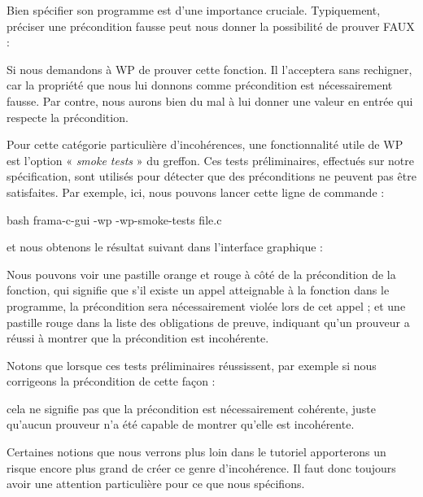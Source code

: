 

Bien spécifier son programme est d'une importance cruciale. Typiquement,
préciser une précondition fausse peut nous donner la possibilité de prouver
FAUX :




Si nous demandons à WP de prouver cette fonction. Il l'acceptera sans rechigner,
car la propriété que nous lui donnons comme précondition est nécessairement fausse.
Par contre, nous aurons bien du mal à lui donner une valeur en entrée qui respecte
la précondition.


Pour cette catégorie particulière d'incohérences, une fonctionnalité utile de WP
est l'option « \textit{smoke tests} » du greffon. Ces tests préliminaires, effectués
sur notre spécification, sont utilisés pour détecter que des préconditions ne peuvent
pas être satisfaites. Par exemple, ici, nous pouvons lancer cette ligne de
commande :


\begin{CodeBlock}{bash}
  frama-c-gui -wp -wp-smoke-tests file.c
\end{CodeBlock}


et nous obtenons le résultat suivant dans l'interface graphique :




Nous pouvons voir une pastille orange et rouge à côté de la précondition de la
fonction, qui signifie que s'il existe un appel atteignable à la fonction dans
le programme, la précondition sera nécessairement violée lors de cet appel ; et
une pastille rouge dans la liste des obligations de preuve, indiquant qu'un
prouveur a réussi à montrer que la précondition est incohérente.


Notons que lorsque ces tests préliminaires réussissent, par exemple si
nous corrigeons la précondition de cette façon :




cela ne signifie pas que la précondition est nécessairement cohérente, juste
qu'aucun prouveur n'a été capable de montrer qu'elle est incohérente.


Certaines notions que nous verrons plus loin dans le tutoriel apporterons un
risque encore plus grand de créer ce genre d'incohérence. Il faut donc toujours
avoir une attention particulière pour ce que nous spécifions.





